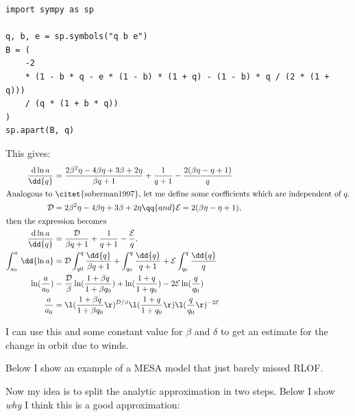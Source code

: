 \documentclass[a4paper,11pt]{article}
\begin{document}
\begin{verbatim}
import sympy as sp

q, b, e = sp.symbols("q b e")
B = (
    -2
    * (1 - b * q - e * (1 - b) * (1 + q) - (1 - b) * q / (2 * (1 + q)))
    / (q * (1 + b * q))
)
sp.apart(B, q)
\end{verbatim}
This gives:
\begin{align*}
	\frac{\text{d} \ln a}{\dd{q} } & = \frac{2\beta^{2}\eta  - 4\beta \eta  + 3\beta  + 2\eta }{\beta q + 1}+ \frac{1}{q + 1} - \frac{2(\beta \eta  - \eta  + 1)}{q}            \\
	\intertext{Analogous to \citet{soberman1997}, let me define some coefficients which are independent of \(q\).}
	\mathcal{D}                    & = 2\beta^{2}\eta  - 4\beta \eta  + 3\beta  + 2\eta \qq{and} \mathcal{E} = 2(\beta \eta  - \eta  + 1),                                      \\
	\intertext{then the expression becomes}
	\frac{\text{d}\ln a}{\dd{q} }  & = \frac{\mathcal{D} }{\beta q + 1}+ \frac{1}{q + 1} - \frac{\mathcal{E} }{q}.                                                              \\
	\int_{a_0}^{a}  \,\dd{ \ln a}  & = \mathcal{D} \int_{q0}^{q}  \frac{\dd{q}}{\beta q + 1} + \int_{q_0}^{q}  \frac{\dd{q}}{q+1} + \mathcal{E}\int_{q_0}^{q}  \frac{\dd{q}}{q} \\
	\ln (\frac{a}{a_{0} })         & = \frac{\mathcal{D}}{\beta }\ln (\frac{1 + \beta q}{1+\beta q_0}) + \ln (\frac{1+q}{ 1+q_0}) - 2 \mathcal{E} \ln (\frac{q}{q_0})           \\
	\frac{a}{a_{0} }               & =\l( \frac{1 + \beta q}{1+\beta q_0}\r)^{\mathcal{D} / \beta }  \l( \frac{1+q}{ 1+q_0}\r) \l( \frac{q}{q_0}\r)^{-2 \mathcal{E} }
\end{align*}

I can use this and some constant value for \(\beta \) and \(\delta \) to get an estimate for the change in orbit
due to winds.

Below I show an example of a MESA model that just barely missed RLOF.

\begin{figure}[ht]
	\centering
\end{figure}

Now my idea is to split the analytic approximation in two steps.
Below I show \emph{why} I think this is a good approximation:
\nextpage
\end{document}

